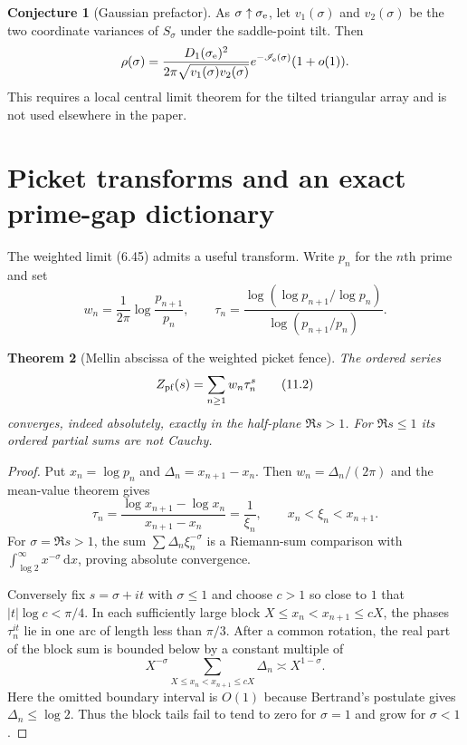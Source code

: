 \documentclass[11pt]{article}
\newtheorem{theorem}{Theorem}[section]
\theoremstyle{definition}
\newtheorem{conjecture}[theorem]{Conjecture}
\theoremstyle{remark}
\newcommand{\dd}{\,\mathrm d}
\begin{document}
\begin{conjecture}[Gaussian prefactor]
\label{conj:edge-prefactor}
As $\sigma\uparrow\sigma_{\rm e}$, let $v_1(\sigma)$ and $v_2(\sigma)$
be the two coordinate variances of
$S_\sigma$ under the saddle-point tilt.  Then
\[
 \rho(\sigma)=
 \frac{D_1(\sigma_{\rm e})^2}{2\pi\sqrt{v_1(\sigma)v_2(\sigma)}}
 e^{-\mathscr I_{\rm e}(\sigma)}(1+o(1)).
\]
This requires a local central limit theorem for the tilted triangular array and is
not used elsewhere in the paper.
\end{conjecture}

\section{Picket transforms and an exact prime-gap dictionary}
\label{sec:picket-transforms}

The weighted limit (6.45) admits a useful transform.  Write $p_n$ for the
$n$th prime and set
\[
 w_n=\frac1{2\pi}\log\frac{p_{n+1}}{p_n},\qquad
 \tau_n=\frac{\log(\log p_{n+1}/\log p_n)}
 {\log(p_{n+1}/p_n)}.
\tag{11.1}
\]

\begin{theorem}[Mellin abscissa of the weighted picket fence]
\label{thm:picket-mellin}
The ordered series
\[
 Z_{\rm pf}(s)=\sum_{n\ge1}w_n\tau_n^s
\tag{11.2}
\]
converges, indeed absolutely, exactly in the half-plane $\Re s>1$.  For
$\Re s\le1$ its ordered partial sums are not Cauchy.
\end{theorem}

\begin{proof}
Put $x_n=\log p_n$ and $\Delta_n=x_{n+1}-x_n$.  Then
$w_n=\Delta_n/(2\pi)$ and the mean-value theorem gives
\[
 \tau_n=\frac{\log x_{n+1}-\log x_n}{x_{n+1}-x_n}
 =\frac1{\xi_n},\qquad x_n<\xi_n<x_{n+1}.
\tag{11.3}
\]
For $\sigma=\Re s>1$, the sum
$\sum\Delta_n\xi_n^{-\sigma}$ is a Riemann-sum comparison with
$\int_{\log2}^\infty x^{-\sigma}\dd x$, proving absolute convergence.

Conversely fix $s=\sigma+it$ with $\sigma\le1$ and choose $c>1$ so close to
$1$ that $|t|\log c<\pi/4$.  In each sufficiently large block
$X\le x_n<x_{n+1}\le cX$, the phases $\tau_n^{it}$ lie in one arc of length
less than $\pi/3$.  After a common rotation, the real part of the block sum is
bounded below by a constant multiple of
\[
 X^{-\sigma}\sum_{X\le x_n<x_{n+1}\le cX}\Delta_n
 \asymp X^{1-\sigma}.
\]
Here the omitted boundary interval is $O(1)$ because Bertrand's postulate gives
$\Delta_n\le\log2$.  Thus the block tails fail to tend to zero for $\sigma=1$
and grow for $\sigma<1$.
\end{proof}
\end{document}
